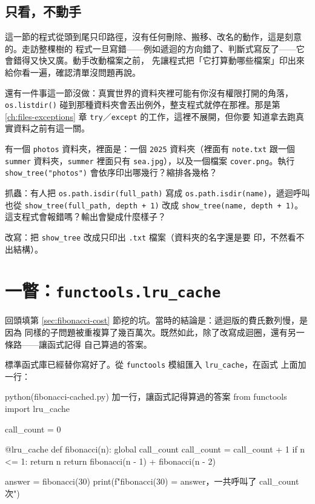 \subsection*{只看，不動手}

這一節的程式從頭到尾只印路徑，沒有任何刪除、搬移、改名的動作，這是刻意的。走訪整棵樹的
程式一旦寫錯——例如遞迴的方向錯了、判斷式寫反了——它會錯得又快又廣。動手改動檔案之前，
先讓程式把「它打算動哪些檔案」印出來給你看一遍，確認清單沒問題再說。

還有一件事這一節沒做：真實世界的資料夾裡可能有你沒有權限打開的角落，
\texttt{os.listdir()} 碰到那種資料夾會丟出例外，整支程式就停在那裡。那是第
\ref{ch:files-exceptions} 章 \texttt{try}／\texttt{except} 的工作，這裡不展開，但你要
知道拿去跑真實資料之前有這一關。

\begin{drills}[label=drills:folder-tree]
\item 有一個 \texttt{photos} 資料夾，裡面是：一個 \texttt{2025} 資料夾（裡面有
\texttt{note.txt} 跟一個 \texttt{summer} 資料夾，\texttt{summer} 裡面只有
\texttt{sea.jpg}），以及一個檔案 \texttt{cover.png}。執行
\texttt{show\_tree("photos")} 會依序印出哪幾行？縮排各幾格？
\item 抓蟲：有人把 \texttt{os.path.isdir(full\_path)} 寫成
\texttt{os.path.isdir(name)}，遞迴呼叫也從 \texttt{show\_tree(full\_path, depth + 1)}
改成 \texttt{show\_tree(name, depth + 1)}。這支程式會報錯嗎？輸出會變成什麼樣子？
\item 改寫：把 \texttt{show\_tree} 改成只印出 \texttt{.txt} 檔案（資料夾的名字還是要
印，不然看不出結構）。
\end{drills}

\section{一瞥：\texttt{functools.lru\_cache}}
\label{sec:lru-cache}

回頭填第 \ref{sec:fibonacci-cost} 節挖的坑。當時的結論是：遞迴版的費氏數列慢，是因為
同樣的子問題被重複算了幾百萬次。既然如此，除了改寫成迴圈，還有另一條路——讓函式記得
自己算過的答案。

標準函式庫已經替你寫好了。從 \texttt{functools} 模組匯入 \texttt{lru\_cache}，在函式
上面加一行：

\begin{example}{python}{(fibonacci-cached.py) 加一行，讓函式記得算過的答案}
from functools import lru_cache

call_count = 0


@lru_cache
def fibonacci(n):
    global call_count
    call_count = call_count + 1
    if n <= 1:
        return n
    return fibonacci(n - 1) + fibonacci(n - 2)


answer = fibonacci(30)
print(f"fibonacci(30) = {answer}，一共呼叫了 {call_count} 次")
\end{example}

